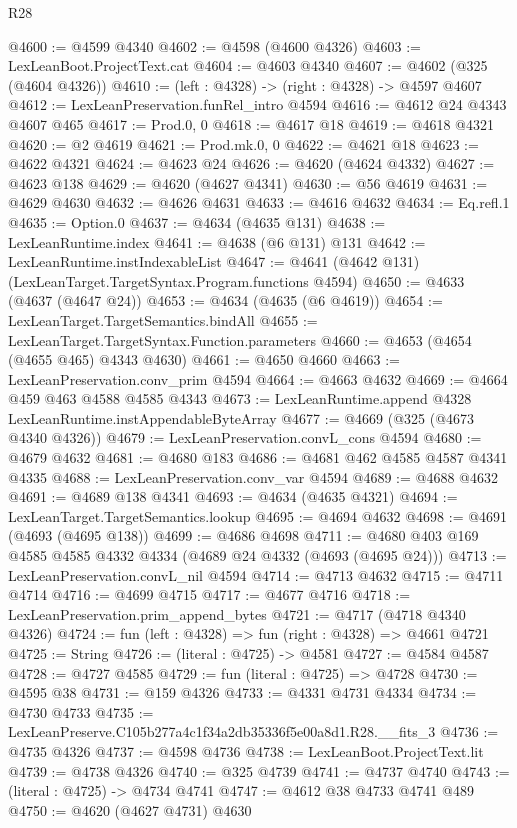 \begin{lexlean}{R28}
\begin{coremodule}
@4600 := @4599 @4340
@4602 := @4598 (@4600 @4326)
@4603 := LexLeanBoot.ProjectText.cat
@4604 := @4603 @4340
@4607 := @4602 (@325 (@4604 @4326))
@4610 := (left : @4328) -> (right : @4328) -> @4597 @4607
@4612 := LexLeanPreservation.funRel_intro @4594
@4616 := @4612 @24 @4343 @4607 @465
@4617 := Prod.{0, 0}
@4618 := @4617 @18
@4619 := @4618 @4321
@4620 := @2 @4619
@4621 := Prod.mk.{0, 0}
@4622 := @4621 @18
@4623 := @4622 @4321
@4624 := @4623 @24
@4626 := @4620 (@4624 @4332)
@4627 := @4623 @138
@4629 := @4620 (@4627 @4341)
@4630 := @56 @4619
@4631 := @4629 @4630
@4632 := @4626 @4631
@4633 := @4616 @4632
@4634 := Eq.refl.{1}
@4635 := Option.{0}
@4637 := @4634 (@4635 @131)
@4638 := LexLeanRuntime.index
@4641 := @4638 (@6 @131) @131
@4642 := LexLeanRuntime.instIndexableList
@4647 := @4641 (@4642 @131) (LexLeanTarget.TargetSyntax.Program.functions @4594)
@4650 := @4633 (@4637 (@4647 @24))
@4653 := @4634 (@4635 (@6 @4619))
@4654 := LexLeanTarget.TargetSemantics.bindAll
@4655 := LexLeanTarget.TargetSyntax.Function.parameters
@4660 := @4653 (@4654 (@4655 @465) @4343 @4630)
@4661 := @4650 @4660
@4663 := LexLeanPreservation.conv_prim @4594
@4664 := @4663 @4632
@4669 := @4664 @459 @463 @4588 @4585 @4343
@4673 := LexLeanRuntime.append @4328 LexLeanRuntime.instAppendableByteArray
@4677 := @4669 (@325 (@4673 @4340 @4326))
@4679 := LexLeanPreservation.convL_cons @4594
@4680 := @4679 @4632
@4681 := @4680 @183
@4686 := @4681 @462 @4585 @4587 @4341 @4335
@4688 := LexLeanPreservation.conv_var @4594
@4689 := @4688 @4632
@4691 := @4689 @138 @4341
@4693 := @4634 (@4635 @4321)
@4694 := LexLeanTarget.TargetSemantics.lookup
@4695 := @4694 @4632
@4698 := @4691 (@4693 (@4695 @138))
@4699 := @4686 @4698
@4711 := @4680 @403 @169 @4585 @4585 @4332 @4334 (@4689 @24 @4332 (@4693 (@4695 @24)))
@4713 := LexLeanPreservation.convL_nil @4594
@4714 := @4713 @4632
@4715 := @4711 @4714
@4716 := @4699 @4715
@4717 := @4677 @4716
@4718 := LexLeanPreservation.prim_append_bytes
@4721 := @4717 (@4718 @4340 @4326)
@4724 := fun (left : @4328) => fun (right : @4328) => @4661 @4721
@4725 := String
@4726 := (literal : @4725) -> @4581
@4727 := @4584 @4587
@4728 := @4727 @4585
@4729 := fun (literal : @4725) => @4728
@4730 := @4595 @38
@4731 := @159 @4326
@4733 := @4331 @4731 @4334
@4734 := @4730 @4733
@4735 := LexLeanPreserve.C105b277a4c1f34a2db35336f5e00a8d1.R28.__fits_3
@4736 := @4735 @4326
@4737 := @4598 @4736
@4738 := LexLeanBoot.ProjectText.lit
@4739 := @4738 @4326
@4740 := @325 @4739
@4741 := @4737 @4740
@4743 := (literal : @4725) -> @4734 @4741
@4747 := @4612 @38 @4733 @4741 @489
@4750 := @4620 (@4627 @4731) @4630

\end{coremodule}
\end{lexlean}
